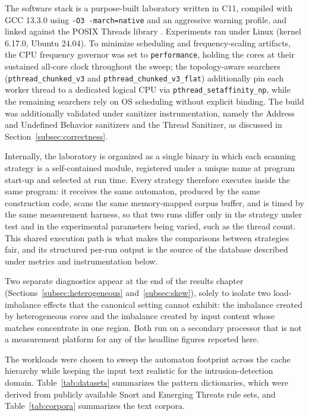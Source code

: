 The software stack is a purpose-built laboratory written in C11, compiled with
GCC 13.3.0 using \texttt{-O3 -march=native} and an aggressive warning profile,
and linked against the POSIX Threads library \cite{Nichols1996}. Experiments ran
under Linux (kernel 6.17.0, Ubuntu 24.04). To minimize scheduling and
frequency-scaling artifacts, the CPU frequency governor was set to
\texttt{performance}, holding the cores at their sustained all-core clock
throughout the sweep; the topology-aware searchers
(\texttt{pthread\_\allowbreak chunked\_\allowbreak v3} and \texttt{pthread\_\allowbreak chunked\_\allowbreak v3\_\allowbreak flat})
additionally pin each worker thread to a dedicated logical CPU via
\texttt{pthread\_\allowbreak setaffinity\_\allowbreak np}, while the remaining searchers rely on OS
scheduling without explicit binding. The build was additionally validated under
sanitizer instrumentation, namely the Address and Undefined Behavior sanitizers
and the Thread Sanitizer, as discussed in Section~\ref{subsec:correctness}.

Internally, the laboratory is organized as a single binary in which each
scanning strategy is a self-contained module, registered under a unique name at
program start-up and selected at run time. Every strategy therefore executes
inside the same program: it receives the same automaton, produced by the same
construction code, scans the same memory-mapped corpus buffer, and is timed by
the same measurement harness, so that two runs differ only in the strategy
under test and in the experimental parameters being varied, such as the thread
count. This shared execution path is what makes the comparisons between
strategies fair, and its structured per-run output is the source of the
database described under metrics and instrumentation below.

Two separate diagnostics appear at the end of the results chapter
(Sections~\ref{subsec:heterogeneous} and~\ref{subsec:skew}), solely to isolate
two load-imbalance effects that the canonical setting cannot exhibit: the
imbalance created by heterogeneous cores and the imbalance created by input
content whose matches concentrate in one region. Both run on a secondary
processor that is not a measurement platform for any of the headline figures
reported here.


The workloads were chosen to sweep the automaton footprint across the cache
hierarchy while keeping the input text realistic for the intrusion-detection
domain. Table~\ref{tab:datasets} summarizes the pattern dictionaries, which were
derived from publicly available Snort and Emerging Threats rule sets, and
Table~\ref{tab:corpora} summarizes the text corpora.

